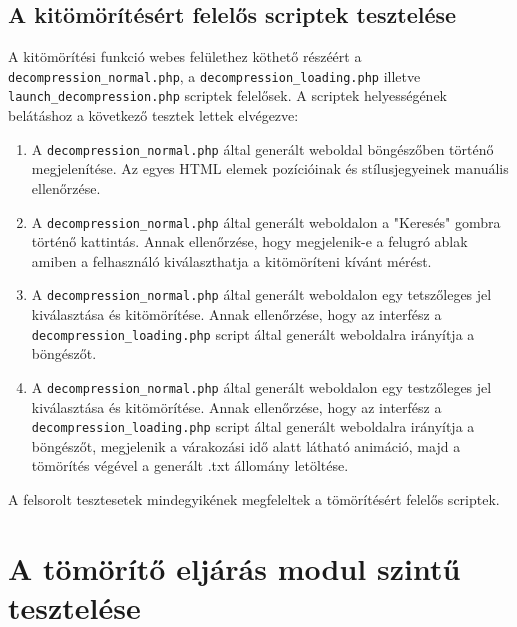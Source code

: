 \documentclass[oneside,titlepage,12pt,a4paper]{report}
\begin{document}
\subsection{A kitömörítésért felelős scriptek tesztelése}

A kitömörítési funkció webes felülethez köthető részéért a \texttt{decompression\_normal.php}, a \texttt{decompression\_loading.php} illetve \texttt{launch\_decompression.php} scriptek felelősek. A scriptek helyességének belátáshoz a következő tesztek lettek elvégezve:

\begin{enumerate}
\item A \texttt{decompression\_normal.php} által generált weboldal böngészőben történő megjelenítése. Az egyes HTML elemek pozícióinak és stílusjegyeinek manuális ellenőrzése.
\item A \texttt{decompression\_normal.php} által generált weboldalon a "Keresés" gombra történő kattintás. Annak ellenőrzése, hogy megjelenik-e a felugró ablak amiben a felhasználó kiválaszthatja a kitömöríteni kívánt mérést.
\item A \texttt{decompression\_normal.php} által generált weboldalon egy tetszőleges jel kiválasztása és kitömörítése. Annak ellenőrzése, hogy az interfész a \linebreak \texttt{decompression\_loading.php} script által generált weboldalra irányítja a böngészőt.

\item A \texttt{decompression\_normal.php} által generált weboldalon egy testzőleges jel kiválasztása és kitömörítése. Annak ellenőrzése, hogy az interfész a \linebreak \texttt{decompression\_loading.php} script által generált weboldalra irányítja a böngészőt, megjelenik a várakozási idő alatt látható animáció, majd a tömörítés végével a generált .txt állomány letöltése. 

\end{enumerate}

A felsorolt tesztesetek mindegyikének megfeleltek a tömörítésért felelős scriptek.


\section{A tömörítő eljárás modul szintű tesztelése} \label{sec::modtests}
\end{document}
